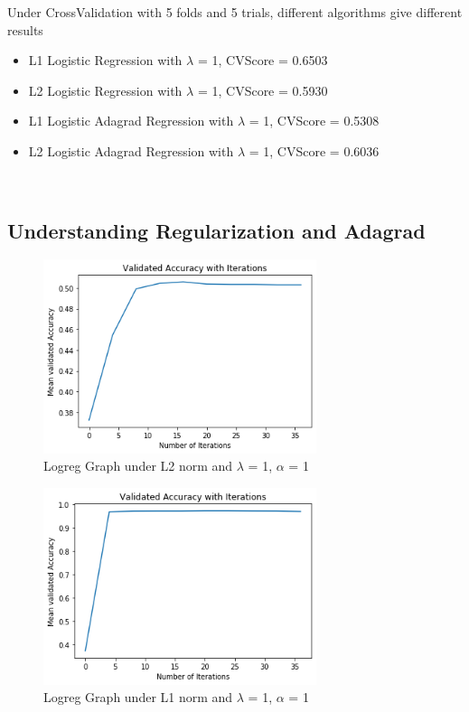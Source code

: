 \documentclass{article}
\begin{document}
		Under CrossValidation with 5 folds and 5 trials, different algorithms give different results
		\begin{itemize}
		\item L1 Logistic Regression with $\lambda$ = 1, CVScore = 0.6503
		\item L2 Logistic Regression with $\lambda$ = 1, CVScore = 0.5930
		\item L1 Logistic Adagrad Regression with $\lambda$ = 1, CVScore = 0.5308
		\item L2 Logistic Adagrad Regression with $\lambda$ = 1, CVScore = 0.6036
		\end{itemize}\\


		\subsection{Understanding Regularization and Adagrad}
		\begin{figure}[H]
			\caption{Logreg Graph under L2 norm and $\lambda$ = 1, $\alpha$ = 1}
			\centering
			\includegraphics[width=8cm]{LogNorm2.png}
		\end{figure}

		\begin{figure}[H]
			\caption{Logreg Graph under L1 norm and $\lambda$ = 1, $\alpha$ = 1}
			\centering
			\includegraphics[width=8cm]{LogNorm1.png}
		\end{figure}
		
\end{document}
